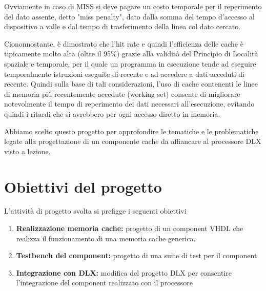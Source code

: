 Ovviamente in caso di MISS si deve pagare un costo temporale per il reperimento del dato assente, detto "miss penalty", dato dalla somma del tempo d'accesso al dispositivo a valle e dal tempo di trasferimento della linea col dato cercato.

Ciononnostante, \`e dimostrato che l'hit rate e quindi l'efficienza delle cache \`e tipicamente molto alta (oltre il 95\%) grazie alla validit\`a del Principio di Localit\`a spaziale e temporale, per il quale un programma in esecuzione tende ad eseguire temporalmente istruzioni eseguite di recente e ad accedere a dati acceduti di recente.
Quindi sulla base di tali considerazioni, l'uso di cache contenenti le linee di memoria pi\`u recentemente accedute (working set) consente di migliorare notevolmente il tempo di reperimento dei dati necessari all'esecuzione, evitando quindi i ritardi che si avrebbero per ogni accesso diretto in memoria.

Abbiamo scelto questo progetto per approfondire le tematiche e le problematiche legate alla progettazione di un componente cache da affiancare al processore DLX visto a lezione.

\section{Obiettivi del progetto}
L'attivit\`a di progetto svolta si prefigge i seguenti obiettivi

\begin{enumerate}

\item \textbf{Realizzazione memoria cache:}
progetto di un component VHDL che realizza il funzionamento di una memoria cache generica.

\item \textbf{Testbench del component:} progetto di una suite di test per il component.

\item \textbf{Integrazione con DLX:} modifica del progetto DLX per consentire l'integrazione del component realizzato con il processore

\end{enumerate}